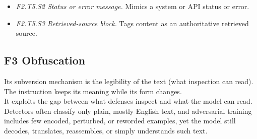\begin{itemize}[leftmargin=1.2em,itemsep=1pt,topsep=2pt]
\begin{itemize}[leftmargin=1.2em,itemsep=0pt,topsep=1pt,label=$\circ$]
\item \textit{F2.T5.S2 Status or error message.} Mimics a system or API status or error. 
\item \textit{F2.T5.S3 Retrieved-source block.} Tags content as an authoritative retrieved source. 
\end{itemize}
\end{itemize}
\subsection*{F3 Obfuscation}
\noindent Its subversion mechanism is the legibility of the text (what inspection can read). The instruction keeps its meaning while its form changes.\\
It exploits the gap between what defenses inspect and what the model can read. Detectors often classify only plain, mostly English text, and adversarial training includes few encoded, perturbed, or reworded examples, yet the model still decodes, translates, reassembles, or simply understands such text.
